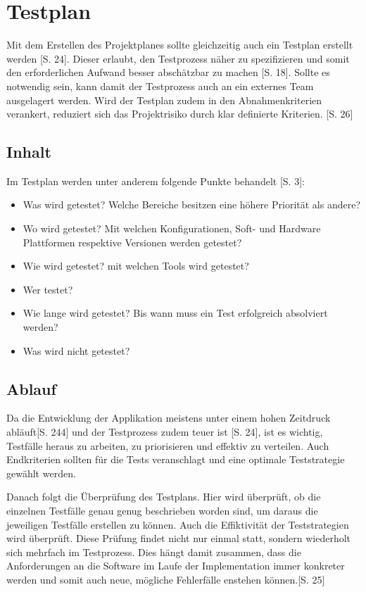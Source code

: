 \documentclass[a4paper,bibtotoc,oneside]{scrbook}
\begin{document}
\chapter{Testplan}

Mit dem Erstellen des Projektplanes sollte gleichzeitig auch ein Testplan erstellt werden \cite{eval_automat_webapp_test}[S. 24]. Dieser erlaubt, den Testprozess näher zu spezifizieren und somit den erforderlichen Aufwand besser abschätzbar zu machen \cite{test_large_systems}[S. 18]. Sollte es notwendig sein, kann damit der Testprozess auch an ein externes Team ausgelagert werden. Wird der Testplan zudem in den Abnahmenkriterien verankert, reduziert sich das Projektrisiko durch klar definierte Kriterien. \cite{eval_automat_webapp_test}[S. 26]

\section{Inhalt}
Im Testplan werden unter anderem folgende Punkte behandelt \cite{test_auto}[S. 3]:

\begin{itemize}
	\item Was wird getestet? Welche Bereiche besitzen eine höhere Priorität als andere?
	\item Wo wird getestet? Mit welchen Konfigurationen, Soft- und Hardware Plattformen respektive Versionen werden getestet?
	\item Wie wird getestet? mit welchen Tools wird getestet?
	\item Wer testet?
	\item Wie lange wird getestet? Bis wann muss ein Test erfolgreich absolviert werden?
	\item Was wird nicht getestet?
\end{itemize}


\section{Ablauf}
Da die Entwicklung der Applikation meistens unter einem hohen Zeitdruck abläuft\cite{software_qual}[S. 244] und der Testprozess zudem teuer ist \cite{eval_regression}[S. 24], ist es wichtig, Testfälle heraus zu arbeiten, zu priorisieren und effektiv zu verteilen. Auch Endkriterien sollten für die Tests veranschlagt und eine optimale Teststrategie gewählt werden.

Danach folgt die Überprüfung des Testplans. Hier wird überprüft, ob die einzelnen Testfälle genau genug beschrieben worden sind, um daraus die jeweiligen Testfälle erstellen zu können. Auch die Effiktivität der Teststrategien wird überprüft. Diese Prüfung findet nicht nur einmal statt, sondern wiederholt sich mehrfach im Testprozess. Dies hängt damit zusammen, dass die Anforderungen an die Software im Laufe der Implementation immer konkreter werden und somit auch neue, mögliche Fehlerfälle enstehen können.\cite{eval_regression}[S. 25] 
\end{document}

